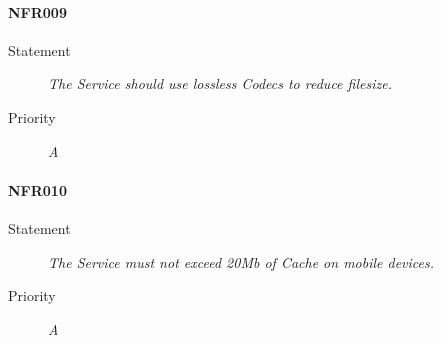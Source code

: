 \paragraph{NFR009}
\begin{description}
  \item [Statement]
    \textit{The Service should use lossless \gls{Codec}s to reduce filesize.}
  \item [Priority] \textit{A}
\end{description}

\paragraph{NFR010}
\begin{description}
  \item [Statement]
    \textit{The Service must not exceed 20Mb of \gls{Cache} on mobile devices.}
  \item [Priority] \textit{A}
\end{description}

